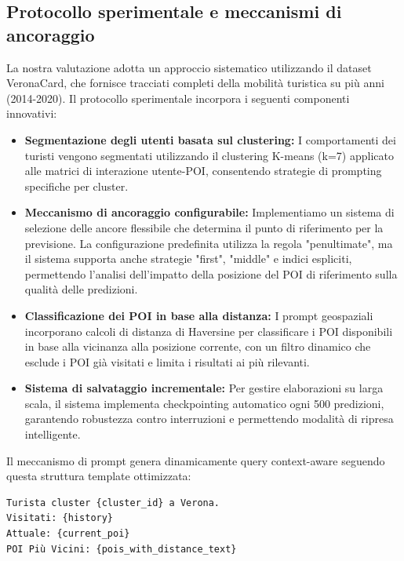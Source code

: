 \begin{itemize}
\begin{enumerate}
\end{enumerate}

\subsection{Protocollo sperimentale e meccanismi di ancoraggio}

La nostra valutazione adotta un approccio sistematico utilizzando il dataset VeronaCard, che fornisce tracciati completi della mobilità turistica su più anni (2014-2020). Il protocollo sperimentale incorpora i seguenti componenti innovativi:

\begin{itemize}
\item \textbf{Segmentazione degli utenti basata sul clustering:} I comportamenti dei turisti vengono segmentati utilizzando il clustering K-means (k=7) applicato alle matrici di interazione utente-POI, consentendo strategie di prompting specifiche per cluster.

\item \textbf{Meccanismo di ancoraggio configurabile:} Implementiamo un sistema di selezione delle ancore flessibile che determina il punto di riferimento per la previsione. La configurazione predefinita utilizza la regola "penultimate", ma il sistema supporta anche strategie "first", "middle" e indici espliciti, permettendo l'analisi dell'impatto della posizione del POI di riferimento sulla qualità delle predizioni.

\item \textbf{Classificazione dei POI in base alla distanza:} I prompt geospaziali incorporano calcoli di distanza di Haversine per classificare i POI disponibili in base alla vicinanza alla posizione corrente, con un filtro dinamico che esclude i POI già visitati e limita i risultati ai più rilevanti.

\item \textbf{Sistema di salvataggio incrementale:} Per gestire elaborazioni su larga scala, il sistema implementa checkpointing automatico ogni 500 predizioni, garantendo robustezza contro interruzioni e permettendo modalità di ripresa intelligente.
\end{itemize}

Il meccanismo di prompt genera dinamicamente query context-aware seguendo questa struttura template ottimizzata:

\begin{lstlisting}[language=text, caption=Template di Prompt Comprensivo]
Turista cluster {cluster_id} a Verona.
Visitati: {history}
Attuale: {current_poi}
POI Più Vicini: {pois_with_distance_text}


\end{lstlisting}
\end{itemize}
